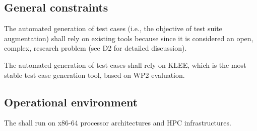


\clearpage

\subsection{General constraints}

\RQ{} The automated generation of test cases (i.e., the objective of test suite augmentation) shall rely on existing tools because since it is considered an open, complex, research problem (see D2 for detailed discussion).  


\RQ{} The automated generation of test cases shall rely on KLEE, which is the most stable test case generation tool, based on WP2 evaluation.

\clearpage

\subsection{Operational environment}



\RQ{} The \FAQAS shall run on x86-64 processor architectures and HPC infrastructures.

